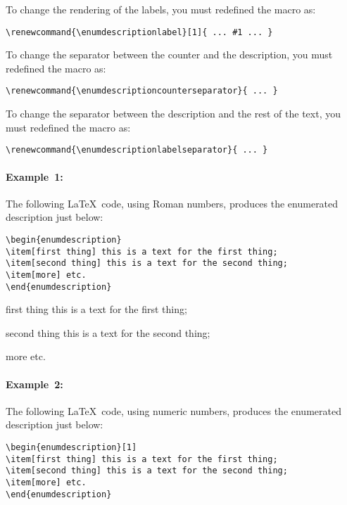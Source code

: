 \documentclass[book,taskpackage,specpackage,codepackage]{upmethodology-document}
\begin{document}
To change the rendering of the labels, you must redefined the macro as:
\begin{verbatim}
\renewcommand{\enumdescriptionlabel}[1]{ ... #1 ... }
\end{verbatim}

To change the separator between the counter and the description, you must redefined the macro as:
\begin{verbatim}
\renewcommand{\enumdescriptioncounterseparator}{ ... }
\end{verbatim}

To change the separator between the description and the rest of the text, you must redefined the macro as:
\begin{verbatim}
\renewcommand{\enumdescriptionlabelseparator}{ ... }
\end{verbatim}

\paragraph{Example~1:} The following \LaTeX~code, using Roman numbers, produces the enumerated description just below:
\begin{verbatim}
\begin{enumdescription}
\item[first thing] this is a text for the first thing;
\item[second thing] this is a text for the second thing;
\item[more] etc.
\end{enumdescription}
\end{verbatim}

\begin{enumdescription}
\item[first thing] this is a text for the first thing;
\item[second thing] this is a text for the second thing;
\item[more] etc.
\end{enumdescription}

\paragraph{Example~2:} The following \LaTeX~code, using numeric numbers, produces the enumerated description just below:
\begin{verbatim}
\begin{enumdescription}[1]
\item[first thing] this is a text for the first thing;
\item[second thing] this is a text for the second thing;
\item[more] etc.
\end{enumdescription}
\end{verbatim}
\end{document}
